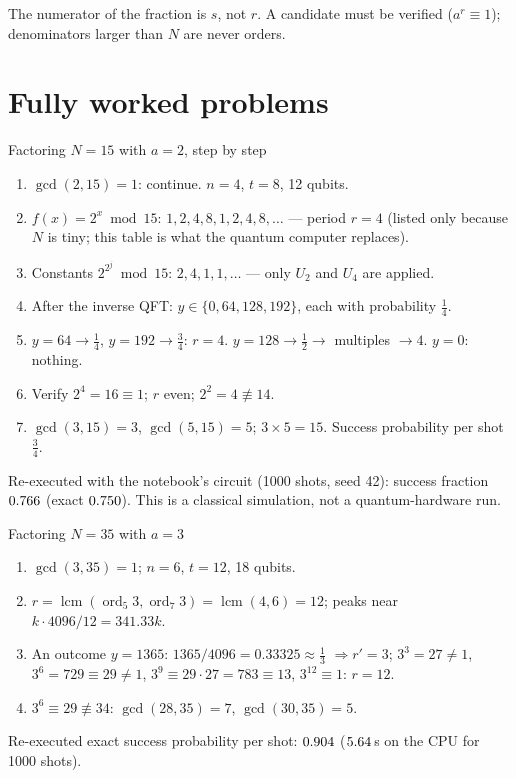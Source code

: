 \documentclass[11pt,a4paper,openany]{book}
\newcounter{wex}[chapter]
\newenvironment{steps}{\begin{enumerate}[label=\textbf{Step \arabic*.}, leftmargin=4.2em, itemsep=2pt]}{\end{enumerate}}
\begin{document}
\begin{trap}
The numerator of the fraction is $s$, not $r$. A candidate must be verified ($a^r \equiv 1$); denominators larger than $N$ are never orders.
\end{trap}

\section{Fully worked problems}
\begin{wexample}{Factoring $N = 15$ with $a = 2$, step by step}
\begin{steps}
\item $\gcd(2, 15) = 1$: continue. $n = 4$, $t = 8$, 12 qubits.
\item $f(x) = 2^x \bmod 15$: $1, 2, 4, 8, 1, 2, 4, 8, \dots$ --- period $r = 4$ (listed only because $N$ is tiny; this table is what the quantum computer replaces).
\item Constants $2^{2^j} \bmod 15$: $2, 4, 1, 1, \dots$ --- only $U_2$ and $U_4$ are applied.
\item After the inverse QFT: $y \in \{0, 64, 128, 192\}$, each with probability $\frac14$.
\item $y = 64 \to \frac14$, $y = 192 \to \frac34$: $r = 4$. $y = 128 \to \frac12 \to$ multiples $\to 4$. $y = 0$: nothing.
\item Verify $2^4 = 16 \equiv 1$; $r$ even; $2^2 = 4 \not\equiv 14$.
\item $\gcd(3, 15) = 3$, $\gcd(5, 15) = 5$; $3\times5 = 15$. Success probability per shot $\frac34$.
\end{steps}
Re-executed with the notebook's circuit (1000 shots, seed 42): success fraction $0.766$ (exact $0.750$). This is a classical
simulation, not a quantum-hardware run.
\end{wexample}

\begin{wexample}{Factoring $N = 35$ with $a = 3$}
\begin{steps}
\item $\gcd(3, 35) = 1$; $n = 6$, $t = 12$, 18 qubits.
\item $r = \operatorname{lcm}(\operatorname{ord}_5 3, \operatorname{ord}_7 3) = \operatorname{lcm}(4, 6) = 12$; peaks near $k\cdot4096/12 = 341.33k$.
\item An outcome $y = 1365$: $1365/4096 = 0.33325 \approx \frac13$ $\Rightarrow r' = 3$; $3^3 = 27 \ne 1$, $3^6 = 729 \equiv 29 \ne 1$, $3^9 \equiv 29\cdot27 = 783 \equiv 13$, $3^{12} \equiv 1$: $r = 12$.
\item $3^6 \equiv 29 \not\equiv 34$: $\gcd(28, 35) = 7$, $\gcd(30, 35) = 5$.
\end{steps}
Re-executed exact success probability per shot: $0.904$ ($5.64$\,s on the CPU for 1000 shots).
\end{wexample}
\end{document}
